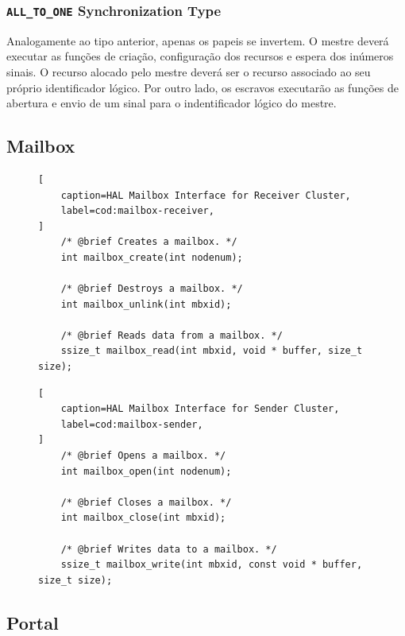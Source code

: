         \subsubsection*{\texttt{ALL\_TO\_ONE} Synchronization Type}

            Analogamente ao tipo anterior, apenas os papeis se invertem.
            O mestre deverá executar as funções de criação, configuração dos
            recursos e espera dos inúmeros sinais.
            O recurso alocado pelo mestre deverá ser o recurso associado ao
            seu próprio identificador lógico.
            Por outro lado, os escravos executarão as funções de abertura
            e envio de um sinal para o indentificador lógico do mestre.

\subsection{Mailbox}


\begin{figure}[t]
\begin{lstlisting}[
    caption=HAL Mailbox Interface for Receiver Cluster,
    label=cod:mailbox-receiver,
]
	/* @brief Creates a mailbox. */
	int mailbox_create(int nodenum);

	/* @brief Destroys a mailbox. */
	int mailbox_unlink(int mbxid);

    /* @brief Reads data from a mailbox. */
	ssize_t mailbox_read(int mbxid, void * buffer, size_t size);
\end{lstlisting}
\end{figure}

\begin{figure}[t]
\begin{lstlisting}[
    caption=HAL Mailbox Interface for Sender Cluster,
    label=cod:mailbox-sender,
]
    /* @brief Opens a mailbox. */
	int mailbox_open(int nodenum);

	/* @brief Closes a mailbox. */
	int mailbox_close(int mbxid);

	/* @brief Writes data to a mailbox. */
	ssize_t mailbox_write(int mbxid, const void * buffer, size_t size);
\end{lstlisting}
\end{figure}

\subsection{Portal}

